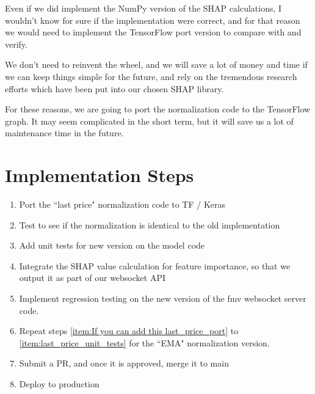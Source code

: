 \documentclass{article}
\begin{document}
Even if we did implement the NumPy version of the SHAP calculations, I wouldn't know for sure if the implementation were correct, and for that reason we would need to implement the TensorFlow port version to compare with and verify. 

We don't need to reinvent the wheel, and we will save a lot of money and time if we can keep things simple for the future, and rely on the tremendous research efforts which have been put into our chosen SHAP library.

For these reasons, we are going to port the normalization code to the TensorFlow graph. It may seem complicated in the short term, but it will save us a lot of maintenance time in the future. 

\section{Implementation Steps}

\begin{enumerate}
    \item \label{item:last_price_port} Port the ``last price" normalization code to TF / Keras
    \item Test to see if the normalization is identical to the old implementation
    \item \label{item:last_price_unit_tests} Add unit tests for new version on the model code
    \item Integrate the SHAP value calculation for feature importance, so that we output it as part of our websocket API
    \item Implement regression testing on the new version of the fmv websocket server code.
    \item Repeat steps \ref{item:If you can add this last_price_port} to \ref{item:last_price_unit_tests} for the ``EMA" normalization version.
    \item Submit a PR, and once it is approved, merge it to main
    \item Deploy to production
\end{enumerate}
\end{document}
